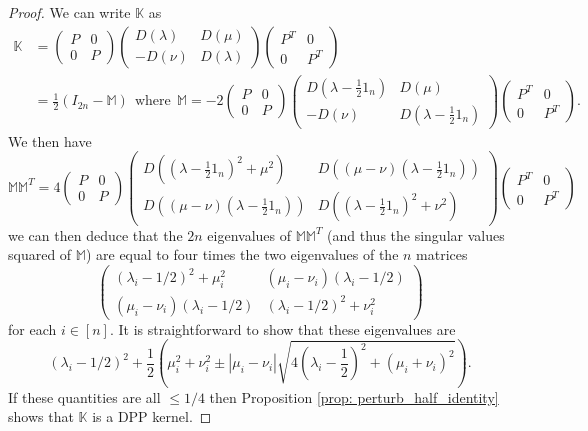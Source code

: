 \documentclass[10pt,a4paper]{amsart}
\renewcommand{\leq}{\leqslant}
\begin{document}
\begin{proof}
We can write $\mathbb{K}$ as
\begin{align*}
\mathbb{K}&=\begin{pmatrix}
P & 0 \\ 0 & P
\end{pmatrix}\begin{pmatrix}
D(\lambda) & D(\mu) \\ -D(\nu) & D(\lambda)
\end{pmatrix}\begin{pmatrix}
P^T & 0 \\ 0 & P^T
\end{pmatrix}\\
&=\frac{1}{2}\left(I_{2n}-\mathbb{M}\right)~~\mbox{where}~~\mathbb{M}=-2\begin{pmatrix}
P & 0 \\ 0 & P
\end{pmatrix}\begin{pmatrix}
D(\lambda-\frac 1 2 1_n) & D(\mu) \\ -D(\nu) & D(\lambda-\frac 1 2 1_n)
\end{pmatrix}\begin{pmatrix}
P^T & 0 \\ 0 & P^T
\end{pmatrix}.
\end{align*}
We then have
\[\mathbb{M}\mathbb{M}^T=4\begin{pmatrix}
P & 0 \\ 0 & P
\end{pmatrix}\begin{pmatrix}
D((\lambda-\frac 1 2 1_n)^2+\mu^2) & D((\mu-\nu)(\lambda-\frac 1 2 1_n)) \\ D((\mu-\nu)(\lambda-\frac 1 2 1_n)) & D((\lambda-\frac 1 2 1_n)^2+\nu^2)
\end{pmatrix}\begin{pmatrix}
P^T & 0 \\ 0 & P^T
\end{pmatrix}\]
we can then deduce that the $2n$ eigenvalues of $\mathbb{M}\mathbb{M}^T$ (and thus the singular values squared of $\mathbb{M}$) are equal to four times the two eigenvalues of the $n$ matrices
\[\begin{pmatrix}
(\lambda_i-1/2)^2+\mu_i^2 & (\mu_i-\nu_i)(\lambda_i-1/2) \\ (\mu_i-\nu_i)(\lambda_i-1/2) & (\lambda_i-1/2)^2+\nu_i^2
\end{pmatrix}\]
for each $i\in[n]$. It is straightforward to show that these eigenvalues are
\[(\lambda_i-1/2)^2 + \frac{1}{2}\left(\mu_i^2+\nu_i^2\pm|\mu_i-\nu_i|\sqrt{4\left(\lambda_i-\frac{1}{2}\right)^2+(\mu_i+\nu_i)^2}\right).\]
If these quantities are all $\leq 1/4$ then Proposition \ref{prop: perturb_half_identity} shows that $\mathbb{K}$ is a DPP kernel.
\end{proof}
\end{document}
